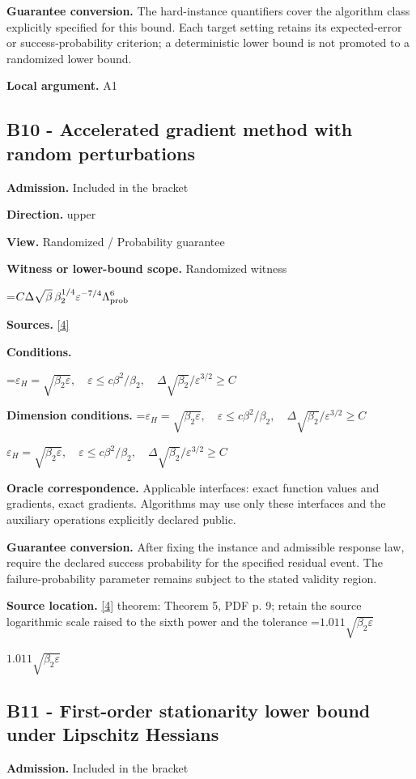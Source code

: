 \documentclass[10pt,a4paper]{article}
\newcommand{\AtlasMath}[1]{\par\begingroup\centering\setbox0=\hbox{$\displaystyle #1$}\ifdim\wd0>1.4\linewidth\typeout{ATLAS WIDE FORMULA: \the\wd0}\fi\ifdim\wd0>\linewidth\resizebox{\linewidth}{!}{\box0}\else\box0\fi\par\endgroup}
\newcommand{\AtlasInlineMath}[1]{\begingroup\setbox0=\hbox{$#1$}\ifdim\wd0>.4\linewidth\endgroup\AtlasMath{#1}\else\endgroup$#1$\fi}
\begin{document}
\textbf{Guarantee conversion.} The hard-instance quantifiers cover the algorithm class explicitly specified for this bound. Each target setting retains its expected-error or success-probability criterion; a deterministic lower bound is not promoted to a randomized lower bound.

\textbf{Local argument.} A1

\subsection{B10 - Accelerated gradient method with random perturbations}
\textbf{Admission.} Included in the bracket

\textbf{Direction.} upper

\textbf{View.} Randomized / Probability guarantee

\textbf{Witness or lower-bound scope.} Randomized witness

\AtlasMath{C\Delta\sqrt\beta\,\beta_2^{1/4}\varepsilon^{-7/4}\Lambda_{\rm prob}^6}
\textbf{Sources.} \href{https://jmlr.org/papers/volume24/22-0522/22-0522.pdf}{[4]}

\textbf{Conditions.} 
\AtlasMath{\varepsilon_H=\sqrt{\beta_2\varepsilon},\quad\varepsilon\le c\beta^2/\beta_2,\quad\Delta\sqrt{\beta_2}/\varepsilon^{3/2}\ge C}


\textbf{Dimension conditions.} \AtlasInlineMath{\varepsilon_H=\sqrt{\beta_2\varepsilon},\quad\varepsilon\le c\beta^2/\beta_2,\quad\Delta\sqrt{\beta_2}/\varepsilon^{3/2}\ge C}

\textbf{Oracle correspondence.} Applicable interfaces: exact function values and gradients, exact gradients. Algorithms may use only these interfaces and the auxiliary operations explicitly declared public.

\textbf{Guarantee conversion.} After fixing the instance and admissible response law, require the declared success probability for the specified residual event. The failure-probability parameter remains subject to the stated validity region.

\textbf{Source location.} \href{https://jmlr.org/papers/volume24/22-0522/22-0522.pdf}{[4]} theorem: Theorem 5, PDF p. 9; retain the source logarithmic scale raised to the sixth power and the tolerance \AtlasInlineMath{1.011\sqrt{\beta_2\varepsilon}}

\subsection{B11 - First-order stationarity lower bound under Lipschitz Hessians}
\textbf{Admission.} Included in the bracket
\end{document}
